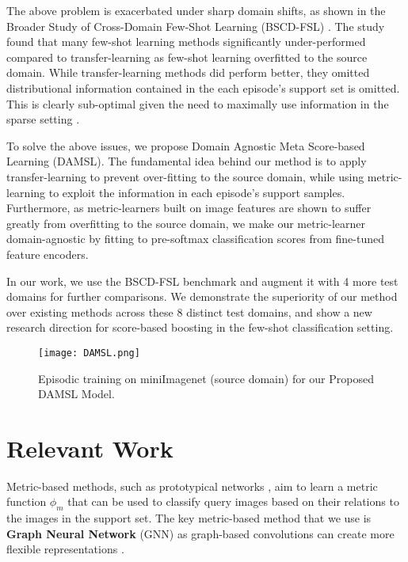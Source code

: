 \documentclass[final]{cvpr}
\begin{document}
The above problem is exacerbated under sharp domain shifts, as shown in the Broader Study of Cross-Domain Few-Shot Learning (BSCD-FSL) \cite{guo2020broader}. The study found that many few-shot learning methods significantly under-performed compared to transfer-learning as few-shot learning overfitted to the source domain. While transfer-learning methods did perform better, they omitted distributional information contained in the each episode's support set is omitted. This is clearly sub-optimal given the need to maximally use information in the sparse setting \cite{zhang2019variational} \cite{triantafillou2017few}.

To solve the above issues, we propose Domain Agnostic Meta Score-based Learning (DAMSL). The fundamental idea behind our method is to apply transfer-learning to prevent over-fitting to the source domain, while using metric-learning to exploit the information in each episode's support samples. Furthermore, as metric-learners built on image features are shown to suffer greatly from overfitting to the source domain, we make our metric-learner domain-agnostic by fitting to pre-softmax classification scores from fine-tuned feature encoders. 

In our work, we use the BSCD-FSL benchmark \cite{guo2020broader} and augment it with 4 more test domains for further comparisons. We demonstrate the superiority of our method over existing methods across these 8 distinct test domains, and show a new research direction for score-based boosting in the few-shot classification setting. 

\begin{figure*}[t]
\begin{center}
   \texttt{[image: DAMSL.png]}
\end{center}
   \caption{Episodic training on miniImagenet (source domain) for our Proposed DAMSL Model.}
\label{fig:DAMSL}
\end{figure*}

\section{Relevant Work}

Metric-based methods, such as prototypical networks \cite{snell2017prototypical}, aim to learn a metric function \(\phi_m\) that can be used to classify query images based on their relations to the images in the support set. The key metric-based method that we use is \textbf{Graph Neural Network} (GNN) as graph-based convolutions can create more flexible representations \cite{bronstein2017geometric}.
\end{document}
